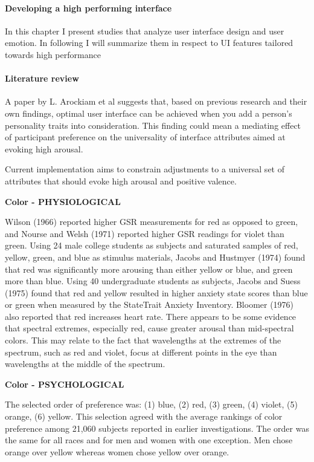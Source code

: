 \paragraph{Developing a high performing interface}

In this chapter I present studies that analyze user interface design and user emotion. In following I will summarize them in respect to UI features tailored towards high performance

\paragraph{Literature review}

A paper by L. Arockiam et al \cite{Arockiam2013} suggests that, based on previous research and their own findings, optimal user interface can be achieved when you add a person's personality traits into consideration. This finding could mean a mediating effect of participant preference on the universality of interface attributes aimed at evoking high arousal. 

Current implementation aims to constrain adjustments to a universal set of attributes that should evoke high arousal and positive valence.


\textbf{Color - PHYSIOLOGICAL}

Wilson (1966) reported higher GSR measurements for red as opposed to green, and Nourse and Welsh (1971) reported higher GSR readings for violet than green. Using 24 male college students as subjects and saturated samples of red, yellow, green, and blue as stimulus materials, Jacobs and Hustmyer (1974) found that red was significantly more arousing than either yellow or blue, and green more than blue. Using 40 undergraduate students as subjects, Jacobs and Suess (1975) found that red and yellow resulted in higher anxiety state scores than blue or green when measured by the StateTrait Anxiety Inventory. Bloomer (1976) also reported that red increases heart rate. There appears to be some evidence that spectral extremes, especially red, cause greater arousal than mid-spectral colors. This may relate to the fact that wavelengths at the extremes of the spectrum, such as red and violet, focus at different points in the eye than wavelengths at the middle of the spectrum. \cite{Pert1996}

\textbf{Color - PSYCHOLOGICAL}

The selected order of preference was: (1) blue, (2) red, (3) green, (4) violet, (5) orange, (6) yellow. This selection agreed with the average rankings of color preference among 21,060 subjects reported in earlier investigations. The order was the same for all races and for men and women with one exception. Men chose orange over yellow whereas women chose yellow over orange. \cite{Pert1996}

